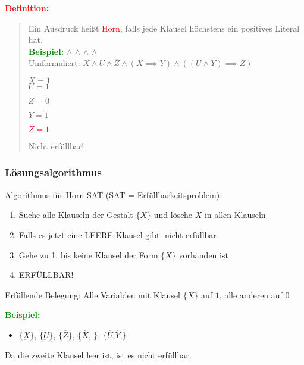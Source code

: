 \documentclass{article}
\newcommand{\red}[1]{\textcolor{red}{#1}}
\newcommand{\green}[1]{\textcolor{green}{#1}}
\newcommand{\ex}{\green{\textbf{Beispiel: }}}
\newcommand{\de}[1]{\red{\textbf{Definition: }}\begin{quote}#1\end{quote}}
\newcommand{\n}[1]{\overline{#1}}
\begin{document}
\de{
    Ein Ausdruck heißt \red{Horn}, falls jede Klausel höchstens ein positives Literal hat.\\
    \ex \underbar{X} $\land$ \underbar{U} $\land$ \underbar{$\n{Z}$} $\land$ \underbar{$(\n{X} \lor Y)$} $\land$ \underbar{$(\n{U} \lor \n{Y} \lor Z)$}\\
    Umformuliert: $X \land U \land \n{Z} \land (X \implies Y) \land ((U \land Y) \implies Z)$

    \begin{minipage}{2.2cm}
        \phantom{}
    \end{minipage}
    \begin{minipage}{1cm}
        $X = 1$\\
        $U = 1$
    \end{minipage}
    \begin{minipage}{1.3cm}
        $Z = 0$
    \end{minipage}
    \begin{minipage}{2.9cm}
        $Y = 1$
    \end{minipage}
    \begin{minipage}{1cm}
        \red{$Z = 1$}
    \end{minipage}

    Nicht erfüllbar!
}

\subsubsection{Lösungsalgorithmus}

Algorithmus für Horn-SAT (SAT = Erfüllbarkeitsproblem):
\begin{enumerate}
    \item Suche alle Klauseln der Gestalt $\{X\}$ und lösche $\n{X}$ in allen Klauseln
    \item Falls es jetzt eine LEERE Klausel gibt: nicht erfüllbar
    \item Gehe zu 1, bis keine Klausel der Form \(\{X\}\) vorhanden ist
    \item ERFÜLLBAR!
\end{enumerate}
Erfüllende Belegung: Alle Variablen mit Klausel \(\{X\}\) auf $1$, alle anderen auf $0$

\newpage
\ex \begin{itemize}
    \item $\{\underbar{X}\}$, $\{\underbar{U}\}$, $\{$\sout{$\n{Z}$}$\}$, $\{$\sout{$\n{X}$}, $\}$, $\{$\sout{$\n{U}$},\sout{$\n{Y}$},$\}$
\end{itemize}
Da die zweite Klausel leer ist, ist es nicht erfüllbar.
\end{document}
